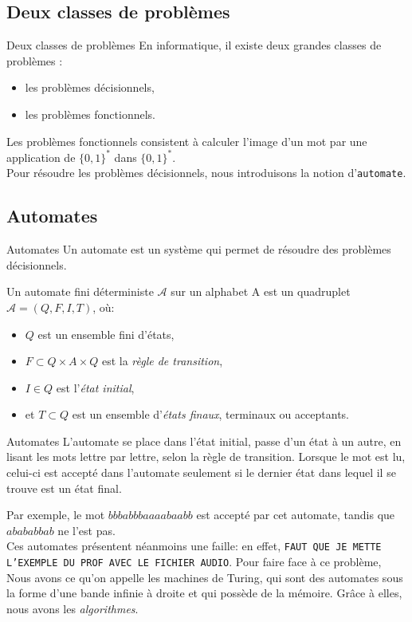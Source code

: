 \documentclass[utf8,10pt,french]{beamer}
\newcommand{\nam}[1]{\texttt{\color{blue}#1}}
\newcommand{\com}[1]{\texttt{\color{red}#1}}
\newcommand{\var}[1]{\textit{\color{green!50!black}#1}}
\begin{document}
\subsection{Deux classes de problèmes}

\begin{frame}{Deux classes de problèmes}
En informatique, il existe deux grandes classes de problèmes :
\begin{itemize}
\item les problèmes décisionnels,
\item les problèmes fonctionnels.
\end{itemize}
Les problèmes fonctionnels consistent à calculer l'image d'un mot par une application de $\{0,1\}^*$ dans $\{0,1\}^*$.\\
Pour résoudre les problèmes décisionnels, nous introduisons la notion d'\nam{automate}.
\end{frame}

\subsection{Automates}
\begin{frame}{Automates}
Un automate est un système qui permet de résoudre des problèmes décisionnels.\\
\begin{definition} 
Un automate fini déterministe $\mathcal{A}$  sur un alphabet A est un quadruplet $\mathcal{A}=(Q,F,I,T)$, où:
\begin{itemize}
	\item $Q$ est un ensemble fini d'états,
	\item $F \subset Q \times A \times Q$ est la \var{règle de transition},
	\item $I \in Q$ est l'\var{état initial},
	\item et $T \subset Q$ est un ensemble d'\var{états finaux}, terminaux ou acceptants.
\end{itemize}
\end{definition}
\end{frame}

\begin{frame}{Automates}
L'automate se place dans l'état initial, passe d'un état à un autre, en lisant les mots lettre par lettre, selon la règle de transition. Lorsque le mot est lu, celui-ci est accepté dans l'automate seulement si le dernier état dans lequel il se trouve est un état final. \\
\begin{center}
\end{center}
Par exemple, le mot $bbbabbbaaaabaabb$ est accepté par cet automate, tandis que $abababbab$ ne l'est pas.\\
Ces automates présentent néanmoins une faille: en effet, \com{FAUT QUE JE METTE L'EXEMPLE DU PROF AVEC LE FICHIER AUDIO}. Pour faire face à ce problème, Nous avons ce qu'on appelle les machines de Turing, qui sont des automates sous la forme d'une bande infinie à droite et qui possède de la mémoire. Grâce à elles, nous avons les \var{algorithmes}. 
\end{frame}
\end{document}

